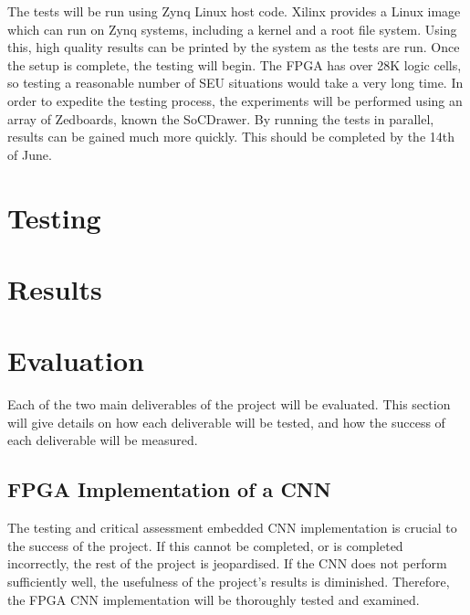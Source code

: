\documentclass[12pt]{article}
\begin{document}
The tests will be run using Zynq Linux host code. Xilinx provides a Linux image which can run on Zynq systems, including a kernel and a root file system. Using this, high quality results can be printed by the system as the tests are run. Once the setup is complete, the testing will begin. The FPGA has over 28K logic cells, so testing a reasonable number of SEU situations would take a very long time. In order to expedite the testing process, the experiments will be performed using an array of Zedboards, known the SoCDrawer. By running the tests in parallel, results can be gained much more quickly. This should be completed by the 14th of June.

\newpage

\section{Testing}
\label{sec:Test}
\vspace{-12pt}

\newpage

\section{Results}
\label{sec:Results}
\vspace{-12pt}

\newpage

\section{Evaluation}
\label{sec:Eval}
\vspace{-12pt}

Each of the two main deliverables of the project will be evaluated. This section will give details on how each deliverable will be tested, and how the success of each deliverable will be measured.

\subsection{FPGA Implementation of a CNN}
\label{sec:Eval-FPGAImplOfCnn}
\vspace{-12pt}

The testing and critical assessment embedded CNN implementation is crucial to the success of the project. If this cannot be completed, or is completed  incorrectly, the rest of the project is jeopardised. If the CNN does not perform sufficiently well, the usefulness of the project's results is diminished. Therefore, the FPGA CNN implementation will be thoroughly tested and examined.
\end{document}
